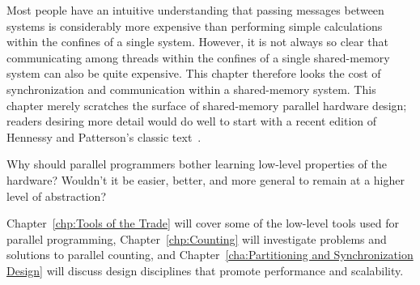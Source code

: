

Most people have an intuitive understanding that passing messages between
systems is considerably more expensive than performing simple calculations
within the confines of a single system.
However, it is not always so clear that communicating among threads within
the confines of a single shared-memory system can also be quite expensive.
This chapter therefore looks the cost of synchronization and communication
within a shared-memory system.
This chapter merely scratches the surface of shared-memory parallel
hardware design; readers desiring more detail would do well to start
with a recent edition of
Hennessy and Patterson's classic text~\cite{Hennessy95a}.

\QuickQuiz{}
	Why should parallel programmers bother learning low-level
	properties of the hardware?
	Wouldn't it be easier, better, and more general to remain at
	a higher level of abstraction?
 \QuickQuizEnd






Chapter~\ref{chp:Tools of the Trade} will cover some of the low-level
tools used for parallel programming,
Chapter~\ref{chp:Counting} will investigate problems and solutions to
parallel counting, and
Chapter~\ref{cha:Partitioning and Synchronization Design}
will discuss design disciplines that promote performance and scalability.
